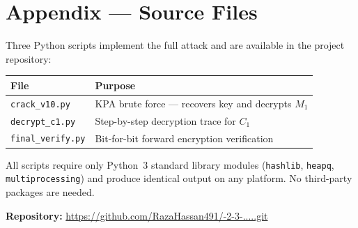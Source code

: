 \documentclass[12pt,a4paper]{article}
\begin{document}
\section*{Appendix — Source Files}

Three Python scripts implement the full attack and are available in the project repository:

\begin{center}
\begin{tabular}{ll}
\toprule
\textbf{File} & \textbf{Purpose} \\
\midrule
\texttt{crack\_v10.py}   & KPA brute force — recovers key and decrypts $M_1$ \\
\texttt{decrypt\_c1.py}  & Step-by-step decryption trace for $C_1$ \\
\texttt{final\_verify.py} & Bit-for-bit forward encryption verification \\
\bottomrule
\end{tabular}
\end{center}

All scripts require only Python~3 standard library modules (\texttt{hashlib}, \texttt{heapq}, \texttt{multiprocessing}) and produce identical output on any platform. No third-party packages are needed.

\vspace{1em}
\noindent\textbf{Repository:}
\url{https://github.com/RazaHassan491/-2-3-.....git}
\end{document}
